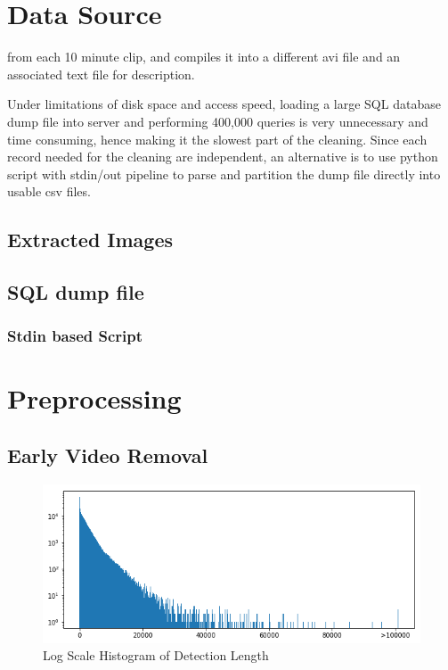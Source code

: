 \documentclass[bsc,logo,twoside,fullspacing,parskip]{infthesis}
\begin{document}
\chapter{Data Source}
\label{sec:datasource}

from each 10 minute clip, and compiles it into a different avi file and an associated text file for description.

Under limitations of disk space and access speed, loading a large SQL database dump file into server and performing 400,000 queries is very unnecessary and time consuming, hence making it the slowest part of the cleaning.
Since each record needed for the cleaning are independent, an alternative is to use python script with stdin/out pipeline to parse and partition the dump file directly into usable csv files.
\section{Extracted Images}
\label{sec:summaries}

\section{SQL dump file}
\subsection{Stdin based Script}

\chapter{Preprocessing}

\section{Early Video Removal}

\begin{figure}
\centering
    \includegraphics[scale=0.6]{graph/frame_distribution.png}
    \caption{Log Scale Histogram of Detection Length}
    \label{fig:vidlength}
\end{figure}
\end{document}
